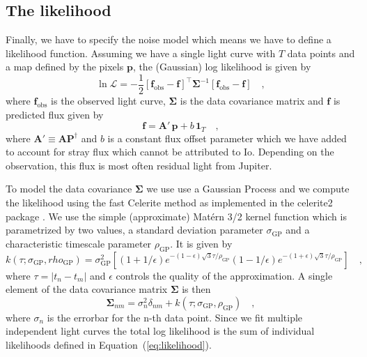 \documentclass[modern]{aastex62}
\begin{document}
\subsection{The likelihood}
\label{ssec:likelihood}
Finally, we have to specify the noise model which means we have to define a likelihood function.
Assuming we have a single light curve with $T$ data points and a map defined by the pixels $\mathbf{p}$, the (Gaussian) log likelihood is given by
\begin{equation}
    \ln\mathcal{L}=-\frac{1}{2}\left[\mathbf{f}_\mathrm{obs}-\mathbf{f} \right]^{\top}
    \boldsymbol{\Sigma}^{-1}\left[\mathbf{f}_\mathrm{obs}-\mathbf{f} \right]
    \quad,
    \label{eq:likelihood}
\end{equation}
where $\mathbf{f}_\mathrm{obs}$ is the observed light curve, $\boldsymbol{\Sigma}$ is the data covariance matrix and $\mathbf{f}$ is predicted flux given by
\begin{equation}
    \mathbf{f}=\mathbf{A}'\,\mathbf{p} +b\,\mathbf{1}_T
    \quad,
    \label{eq:flux_model}
\end{equation}
where $\mathbf{A}'\equiv\mathbf{A}\mathbf{P}^\dagger$ and $b$ is a constant flux offset parameter which we have added to account for stray flux which cannot be attributed to Io.
Depending on the observation, this flux is most often residual light from Jupiter.

To model the data covariance $\boldsymbol{\Sigma}$ we use use a Gaussian Process and we compute the likelihood using the fast Celerite method \citep{foreman-mackey2017} as implemented in the \textsf{celerite2} package \citep{foreman-mackey2017a,foreman-mackey2018}.
We use the simple (approximate) Mat\'ern 3/2 kernel function which is parametrized by two values, a standard deviation parameter $\sigma_\mathrm{GP}$ and a characteristic timescale parameter $\rho_\mathrm{GP}$.
It is given by 
\begin{equation}
    k(\tau;\sigma_\mathrm{GP},
    rho_\mathrm{GP})=\sigma_\mathrm{GP}^{2}\left[(1+1 / \epsilon) e^{-(1-\epsilon) \sqrt{3} \tau / \rho_\mathrm{GP}}(1-1 / \epsilon) e^{-(1+\epsilon) \sqrt{3} \tau / \rho_\mathrm{GP}}\right]
    \quad,
\end{equation}
where $\tau=|t_n-t_m|$ and $\epsilon$ controls the quality of the approximation.
A single element of the data covariance matrix $\boldsymbol{\Sigma}$ is then 
\begin{equation}
    \boldsymbol{\Sigma}_{nm}=\sigma_n^2\delta_{nm} + k(\tau;\sigma_\mathrm{GP},\rho_\mathrm{GP})
    \quad,
    \label{eq:data_covariance_element}
\end{equation}
where $\sigma_n$ is the errorbar for the n-th data point.
Since we fit multiple independent light curves the total log likelihood is the sum of individual likelihoods defined in Equation~(\ref{eq:likelihood}).
\end{document}
